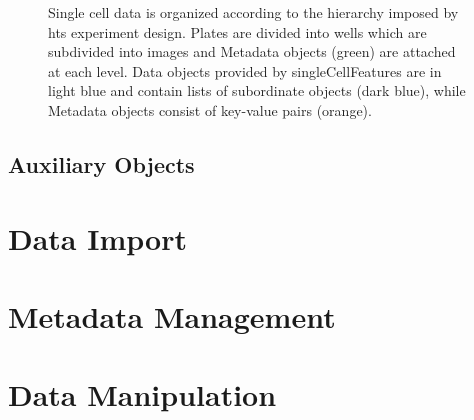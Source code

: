 \begin{figure}
  \caption[Data structure used for representing a complete plate of single cell data.]{Single cell data is organized according to the hierarchy imposed by \gls{hts} experiment design. Plates are divided into wells which are subdivided into images and Metadata objects (green) are attached at each level. Data objects provided by singleCellFeatures are in light blue and contain lists of subordinate objects (dark blue), while Metadata objects consist of key-value pairs (orange).}
  \label{fig:scf-platedata}
\end{figure}

\subsection{Auxiliary Objects}

\section{Data Import}
\label{sec:data-import}
\section{Metadata Management}
\label{sec:metadata-management}

\section{Data Manipulation}
